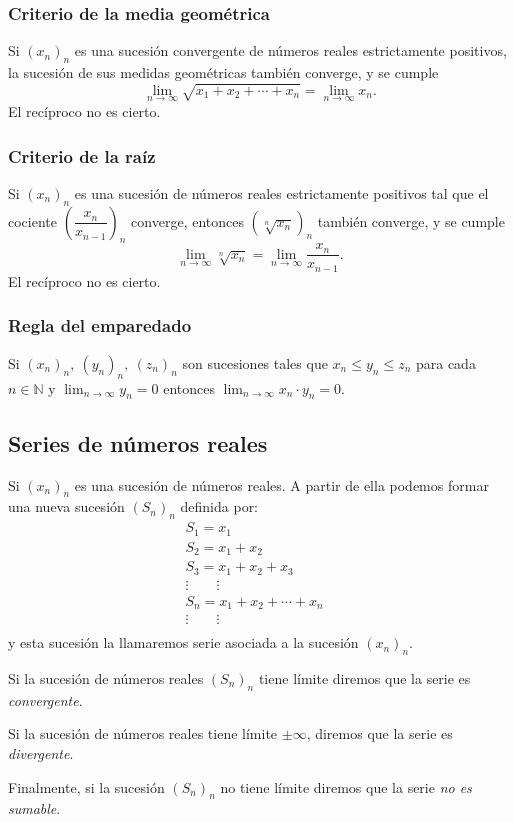 \documentclass[12pt]{article}
\begin{document}
\subsubsection{Criterio de la media geométrica}
Si $(x_n)_n $ es una sucesión convergente de números reales estrictamente positivos, la sucesión de sus medidas geométricas también converge, y se cumple \[ \lim_{n\to\infty}\sqrt{x_1+x_2+\cdots+x_n}=\lim_{n\to\infty}x_n. \] El recíproco no es cierto.
\subsubsection{Criterio de la raíz}
Si $(x_n)_n$ es una sucesión de números reales estrictamente positivos tal que el cociente $\left(\dfrac{x_n}{x_{n-1}}\right)_{n}$ converge, entonces $\left(\sqrt[n]{x_n}\right)_n$ también converge, y se cumple \[ \lim_{n\to\infty}\sqrt[n]{x_n}=\lim_{n\to\infty}\dfrac{x_n}{x_{n-1}}. \] El recíproco no es cierto.
\subsubsection{Regla del emparedado}
Si $(x_n)_n,~(y_n)_n,~(z_n)_n $ son sucesiones tales que $x_n\le y_n\le z_n$ para cada $n\in\mathbb{N}$ y $\lim_{n\to\infty}y_n=0$ entonces $\lim_{n\to\infty}x_n\cdot y_n=0$.
\subsection{Series de números reales}
Si $(x_n)_n$ es una sucesión de números reales. A partir de ella podemos formar una nueva sucesión $(S_n)_n$ definida por: \[ \begin{array}{c}
	S_1=x_1\\
	S_2=x_1+x_2\\
	S_3=x_1+x_2+x_3\\
	\vdots\qquad\vdots\qquad\qquad\qquad\quad\\
	S_n=x_1+x_2+\cdots+x_n\\
	\vdots\qquad\vdots\qquad\qquad\qquad\qquad~\\
\end{array} \] y esta sucesión la llamaremos serie asociada a la sucesión $(x_n)_n$.

Si la sucesión de números reales $(S_n)_n$ tiene límite diremos que la serie es \textit{convergente}.

Si la sucesión de números reales tiene límite $\pm\infty$, diremos que la serie es \textit{divergente}.

Finalmente, si la sucesión $(S_n)_n$ no tiene límite diremos que la serie \textit{no es sumable}.
\end{document}
